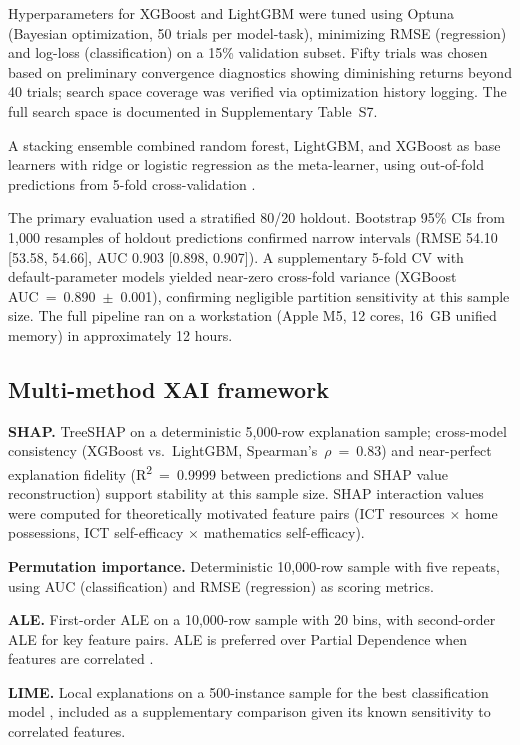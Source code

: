 \documentclass[review,12pt]{elsarticle}
\begin{document}
Hyperparameters for XGBoost and LightGBM were tuned using Optuna (Bayesian optimization, 50 trials per model-task), minimizing RMSE (regression) and log-loss (classification) on a 15\% validation subset. Fifty trials was chosen based on preliminary convergence diagnostics showing diminishing returns beyond 40 trials; search space coverage was verified via optimization history logging. The full search space is documented in Supplementary Table~S7.

A stacking ensemble combined random forest, LightGBM, and XGBoost as base learners with ridge or logistic regression as the meta-learner, using out-of-fold predictions from 5-fold cross-validation \citep{Gomez_Talal_2025}.

The primary evaluation used a stratified 80/20 holdout. Bootstrap 95\% CIs from 1,000 resamples of holdout predictions confirmed narrow intervals (RMSE 54.10 [53.58, 54.66], AUC 0.903 [0.898, 0.907]). A supplementary 5-fold CV with default-parameter models yielded near-zero cross-fold variance (XGBoost AUC~=~0.890~$\pm$~0.001), confirming negligible partition sensitivity at this sample size. The full pipeline ran on a workstation (Apple M5, 12 cores, 16~GB unified memory) in approximately 12 hours.

\subsection{Multi-method XAI framework}

\textbf{SHAP.} TreeSHAP on a deterministic 5,000-row explanation sample; cross-model consistency (XGBoost vs.\ LightGBM, Spearman's~$\rho$~=~0.83) and near-perfect explanation fidelity (R\textsuperscript{2}~=~0.9999 between predictions and SHAP value reconstruction) support stability at this sample size. SHAP interaction values were computed for theoretically motivated feature pairs (ICT resources $\times$ home possessions, ICT self-efficacy $\times$ mathematics self-efficacy).

\textbf{Permutation importance.} Deterministic 10,000-row sample with five repeats, using AUC (classification) and RMSE (regression) as scoring metrics.

\textbf{ALE.} First-order ALE on a 10,000-row sample with 20 bins, with second-order ALE for key feature pairs. ALE is preferred over Partial Dependence when features are correlated \citep{Molnar_2022,Herbinger_2024_GADGET}.

\textbf{LIME.} Local explanations on a 500-instance sample for the best classification model \citep{Ribeiro_2016}, included as a supplementary comparison given its known sensitivity to correlated features.
\end{document}

